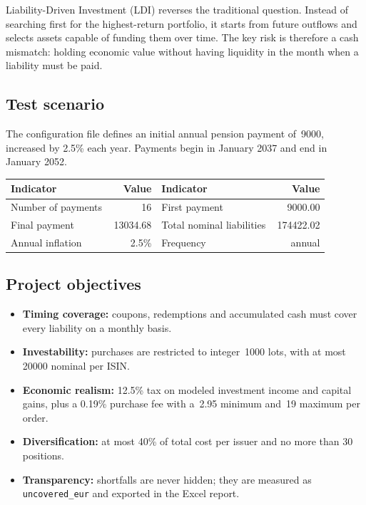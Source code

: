 \documentclass[10pt,a4paper]{article}
\newcommand{\EUR}[1]{\mbox{\texteuro\,\num{#1}}}
\begin{document}
Liability-Driven Investment (LDI) reverses the traditional question. Instead of searching first for the highest-return portfolio, it starts from future outflows and selects assets capable of funding them over time. The key risk is therefore a cash mismatch: holding economic value without having liquidity in the month when a liability must be paid.

\subsection{Test scenario}
The configuration file defines an initial annual pension payment of \EUR{9000}, increased by \num{2.5}\% each year. Payments begin in January 2037 and end in January 2052.

\begin{center}
\renewcommand{\arraystretch}{1.25}
\begin{tabular}{@{}lr@{\qquad}lr@{}}
\toprule
\textbf{Indicator} & \textbf{Value} & \textbf{Indicator} & \textbf{Value}\\
\midrule
Number of payments & 16 & First payment & \EUR{9000.00}\\
Final payment & \EUR{13034.68} & Total nominal liabilities & \EUR{174422.02}\\
Annual inflation & \num{2.5}\% & Frequency & annual\\
\bottomrule
\end{tabular}
\end{center}

\subsection{Project objectives}
\begin{itemize}
  \item \textbf{Timing coverage:} coupons, redemptions and accumulated cash must cover every liability on a monthly basis.
  \item \textbf{Investability:} purchases are restricted to integer \EUR{1000} lots, with at most \EUR{20000} nominal per ISIN.
  \item \textbf{Economic realism:} \num{12.5}\% tax on modeled investment income and capital gains, plus a \num{0.19}\% purchase fee with a \EUR{2.95} minimum and \EUR{19} maximum per order.
  \item \textbf{Diversification:} at most \num{40}\% of total cost per issuer and no more than 30 positions.
  \item \textbf{Transparency:} shortfalls are never hidden; they are measured as \texttt{uncovered\_eur} and exported in the Excel report.
\end{itemize}
\end{document}
